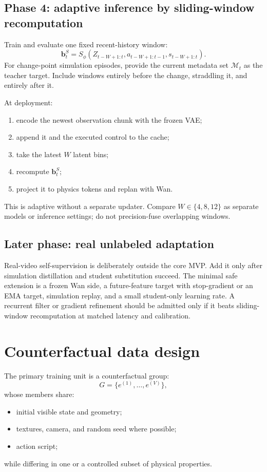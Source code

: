 \documentclass[11pt]{article}
\newcommand{\bvec}{\bm b}
\newcommand{\meta}{\mathcal M}
\begin{document}
\subsection{Phase 4: adaptive inference by sliding-window recomputation}

Train and evaluate one fixed recent-history window:
\begin{equation}
  \bvec_t^S=S_\phi(Z_{t-W+1:t},a_{t-W+1:t-1},s_{t-W+1:t}).
\end{equation}
For change-point simulation episodes, provide the current metadata set
$\meta_t$ as the teacher target.  Include windows entirely before the change,
straddling it, and entirely after it.

At deployment:
\begin{enumerate}
  \item encode the newest observation chunk with the frozen VAE;
  \item append it and the executed control to the cache;
  \item take the latest $W$ latent bins;
  \item recompute $\bvec_t^S$;
  \item project it to physics tokens and replan with Wan.
\end{enumerate}
This is adaptive without a separate updater.  Compare $W\in\{4,8,12\}$ as
separate models or inference settings; do not precision-fuse overlapping
windows.

\subsection{Later phase: real unlabeled adaptation}

Real-video self-supervision is deliberately outside the core MVP.  Add it only
after simulation distillation and student substitution succeed.  The minimal
safe extension is a frozen Wan side, a future-feature target with stop-gradient
or an EMA target, simulation replay, and a small student-only learning rate.
A recurrent filter or gradient refinement should be admitted only if it beats
sliding-window recomputation at matched latency and calibration.

\section{Counterfactual data design}

The primary training unit is a counterfactual group:
\begin{equation}
  G=\{e^{(1)},\ldots,e^{(V)}\},
\end{equation}
whose members share:
\begin{itemize}
  \item initial visible state and geometry;
  \item textures, camera, and random seed where possible;
  \item action script;
\end{itemize}
while differing in one or a controlled subset of physical properties.
\end{document}
